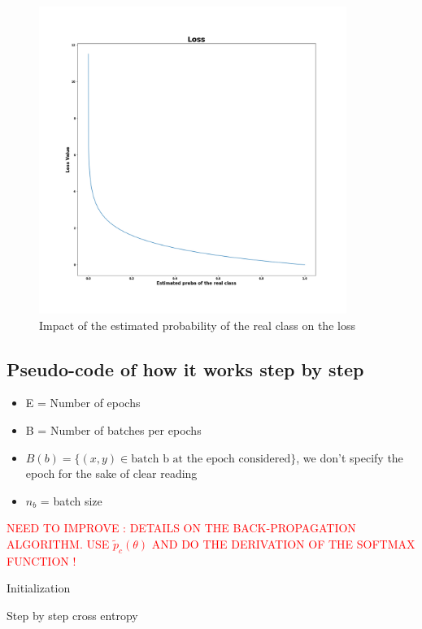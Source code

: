 \documentclass[11pt]{article}
\begin{document}
\begin{figure}[h]
    \centering
    \includegraphics[width=10cm]{crossentropy_1d.png}
    \caption{Impact of the estimated probability of the real class on the loss}
    \label{fig:crossentropy_1d}
\end{figure}
\newpage




\subsection{Pseudo-code of how it works step by step}
\begin{itemize}
    \item E = Number of epochs 
    \item B = Number of batches per epochs
    \item $B(b) = \{(x,y) \in \text{batch b at the epoch considered}\}$, we don't specify the epoch for the sake of clear reading
    \item $n_b $ = batch size
\end{itemize}

\textcolor{red}{NEED TO IMPROVE : DETAILS ON THE BACK-PROPAGATION ALGORITHM.  USE $\tilde{p}_c(\theta)$ AND DO THE DERIVATION OF THE SOFTMAX FUNCTION ! }


\begin{tcolorbox}[colback = white, sharp corners=all]
\begin{algorithm}[H]
 Initialization\;
\caption{Step by step cross entropy}
\end{algorithm}
\end{tcolorbox}
\end{document}

